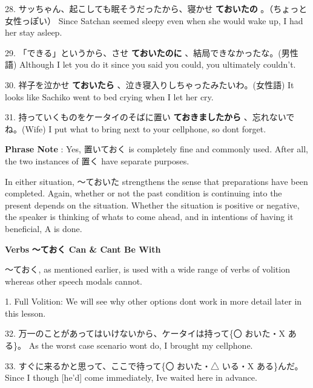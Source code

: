 \par{28. サッちゃん、起こしても眠そうだったから、寝かせ \textbf{ておいたの }。（ちょっと女性っぽい） \hfill\break
Since Satchan seemed sleepy even when she would wake up, I had her stay asleep. }

\par{29. 「できる」というから、させ \textbf{ておいたのに }、結局できなかったな。(男性語) \hfill\break
Although I let you do it since you said you could, you ultimately couldn't. }

\par{30. 祥子を泣かせ \textbf{ておいたら }、泣き寝入りしちゃったみたいわ。(女性語) \hfill\break
It looks like Sachiko went to bed crying when I let her cry. }

\par{31. 持っていくものをケータイのそばに置い \textbf{ておきましたから }、忘れないでね。(Wife) \hfill\break
I put what to bring next to your cellphone, so don\textquotesingle t forget. }

\par{\textbf{Phrase Note }: Yes, 置いておく is completely fine and commonly used. After all, the two instances of 置く have separate purposes. }

\par{ In either situation, ～ておいた strengthens the sense that preparations have been completed. Again, whether or not the past condition is continuing into the present depends on the situation. Whether the situation is positive or negative, the speaker is thinking of what\textquotesingle s to come ahead, and in intentions of having it beneficial, A is done. }

\par{\textbf{Verbs }\textbf{～ておく Can \& Can\textquotesingle t Be With }}

\par{ ～ておく, as mentioned earlier, is used with a wide range of verbs of volition whereas other speech modals cannot. }

\par{1. Full Volition: We will see why other options don\textquotesingle t work in more detail later in this lesson. }

\par{32. 万一のことがあってはいけないから、ケータイは持って\{〇 おいた・X ある\}。 \hfill\break
As the worst case scenario won\textquotesingle t do, I brought my cellphone. }

\par{33. すぐに来るかと思って、ここで待って\{〇 おいた・△ いる・X ある\}んだ。 \hfill\break
Since I though [he'd] come immediately, I\textquotesingle ve waited here in advance. }

